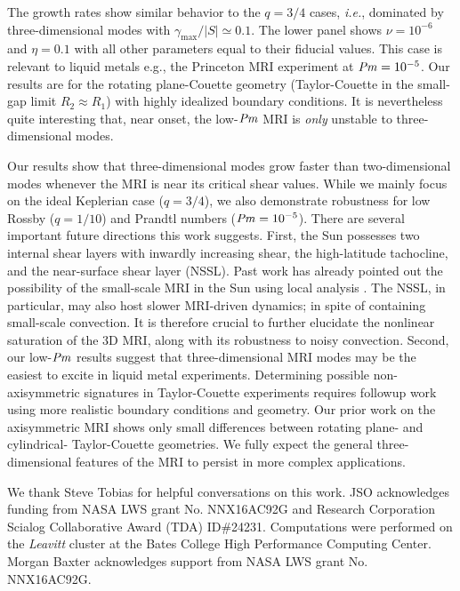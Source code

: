 \documentclass[aps,prl,reprint,superscriptaddress]{revtex4-1}
\newcommand{\Prm}{\mbox{\textit{Pm}}}
\begin{document}
The growth rates show similar behavior to the $q=3/4$ cases, \textit{i.e.}, dominated by three-dimensional modes with $\gamma_{\text{max}}/|S|\simeq0.1$.
The lower panel shows $\nu=10^{-6}$ and $\eta=0.1$ with all other parameters equal to their fiducial values. 
This case is relevant to liquid metals e.g., the Princeton MRI experiment \citep{2002JFM...462..365G}
at $\Prm=10^{-5}$. 
Our results are for the rotating plane-Couette geometry (Taylor-Couette in the small-gap limit $R_{2}\approx{R}_{1}$) with highly idealized boundary conditions.
It is nevertheless quite interesting that, near onset, the low-$\Prm$ MRI is \emph{only} unstable to three-dimensional modes.

Our results show that three-dimensional modes grow faster than two-dimensional modes whenever the MRI is near its critical shear values.
While we mainly focus on the ideal Keplerian case ($q=3/4$), we also demonstrate robustness for low Rossby ($q=1/10$) and Prandtl numbers ($\Prm=10^{-5}$).
There are several important future directions this work suggests.
First, the Sun possesses two internal shear layers with inwardly increasing shear, the high-latitude tachocline, and the near-surface shear layer (NSSL). 
Past work has already pointed out the possibility of the small-scale MRI in the Sun using local analysis \citep{doi:10.1086/522426,doi:10.1111/j.1745-3933.2010.00987.x,doi:10.1088/0004-637X/787/1/21}.
The NSSL, in particular, may also host slower MRI-driven dynamics; in spite of containing small-scale convection.
It is therefore crucial to further elucidate the nonlinear saturation of the 3D MRI, along with its robustness to noisy convection.
Second, our low-$\Prm$ results suggest that three-dimensional MRI modes may be the easiest to excite in liquid metal experiments.
Determining possible non-axisymmetric signatures in Taylor-Couette experiments requires followup work using more realistic boundary conditions and geometry. 
Our prior work on the axisymmetric MRI \citep{2017ApJ...841....1C,2017ApJ...841....2C} shows only small differences between rotating plane- and cylindrical- Taylor-Couette geometries. 
We fully expect the general three-dimensional features of the MRI to persist in more complex applications. 


\begin{acknowledgments}
We thank Steve Tobias for helpful conversations on this work.
JSO acknowledges funding from NASA LWS grant No. NNX16AC92G and Research Corporation Scialog Collaborative Award (TDA) ID\#24231. Computations were performed on the \emph{Leavitt} cluster at the Bates College High Performance Computing Center.
Morgan Baxter acknowledges support from NASA LWS grant No. NNX16AC92G.
\end{acknowledgments}


\end{document}
